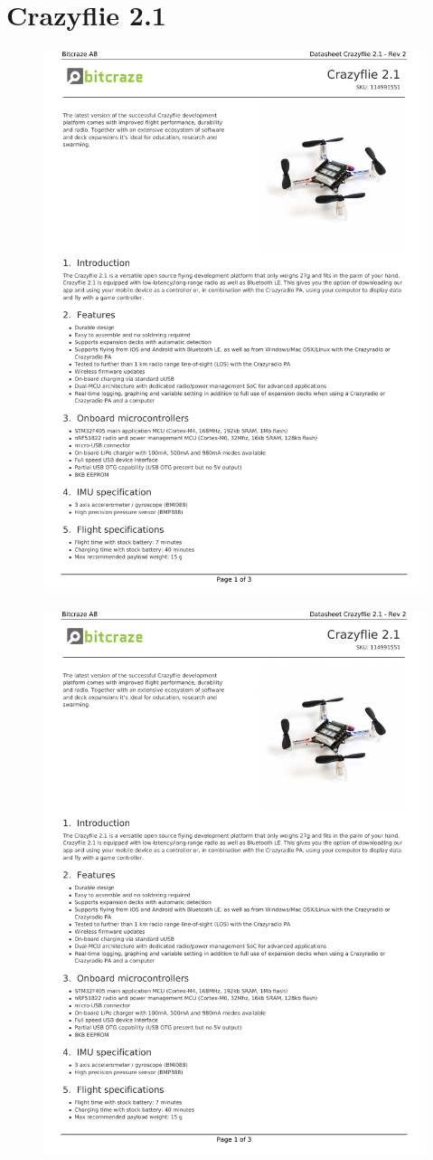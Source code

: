 	\section{Crazyflie 2.1}
	\begin{figure}[H]
	\centering
	\includegraphics[page=1,width=.8\textwidth]{anhang/crazyfliedatasheet.pdf}
\end{figure}

	\begin{figure}[H]
	\centering
	\includegraphics[page=2,width=.8\textwidth]{anhang/crazyfliedatasheet.pdf}
\end{figure}

